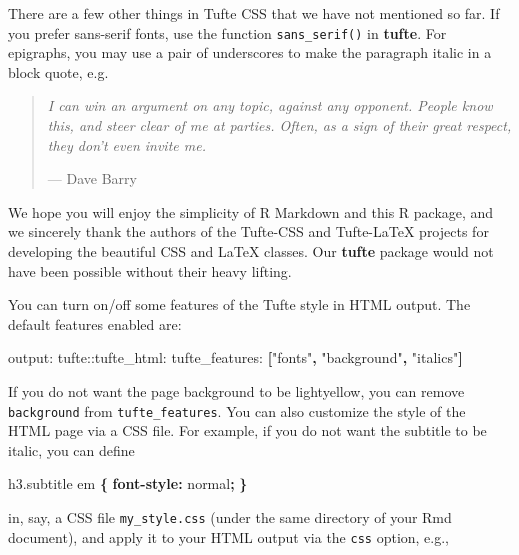 \documentclass[]{tufte-handout}
\newenvironment{Shaded}{}{}
\newcommand{\KeywordTok}[1]{\textcolor[rgb]{0.00,0.44,0.13}{\textbf{#1}}}
\newcommand{\DataTypeTok}[1]{\textcolor[rgb]{0.56,0.13,0.00}{#1}}
\newcommand{\FloatTok}[1]{\textcolor[rgb]{0.25,0.63,0.44}{#1}}
\newcommand{\StringTok}[1]{\textcolor[rgb]{0.25,0.44,0.63}{#1}}
\newcommand{\FunctionTok}[1]{\textcolor[rgb]{0.02,0.16,0.49}{#1}}
\newcommand{\AttributeTok}[1]{\textcolor[rgb]{0.49,0.56,0.16}{#1}}
\newcommand{\NormalTok}[1]{#1}
\begin{document}
There are a few other things in Tufte CSS that we have not mentioned so
far. If you prefer \textsf{sans-serif fonts}, use the function
\texttt{sans\_serif()} in \textbf{tufte}. For epigraphs, you may use a
pair of underscores to make the paragraph italic in a block quote, e.g.

\begin{quote}
\emph{I can win an argument on any topic, against any opponent. People
know this, and steer clear of me at parties. Often, as a sign of their
great respect, they don't even invite me.}

\hfill --- Dave Barry
\end{quote}

We hope you will enjoy the simplicity of R Markdown and this R package,
and we sincerely thank the authors of the Tufte-CSS and Tufte-LaTeX
projects for developing the beautiful CSS and LaTeX classes. Our
\textbf{tufte} package would not have been possible without their heavy
lifting.

You can turn on/off some features of the Tufte style in HTML output. The
default features enabled are:

\begin{Shaded}
\begin{Highlighting}[]
\FunctionTok{output:}
  \FunctionTok{tufte:}\AttributeTok{:tufte_html:}
    \FunctionTok{tufte_features:}\AttributeTok{ }\KeywordTok{[}\StringTok{"fonts"}\KeywordTok{,} \StringTok{"background"}\KeywordTok{,} \StringTok{"italics"}\KeywordTok{]}
\end{Highlighting}
\end{Shaded}

If you do not want the page background to be lightyellow, you can remove
\texttt{background} from \texttt{tufte\_features}. You can also
customize the style of the HTML page via a CSS file. For example, if you
do not want the subtitle to be italic, you can define

\begin{Shaded}
\begin{Highlighting}[]
\NormalTok{h3}\FloatTok{.subtitle}\NormalTok{ em }\KeywordTok{\{}
  \KeywordTok{font-style:} \DataTypeTok{normal}\KeywordTok{;}
\KeywordTok{\}}
\end{Highlighting}
\end{Shaded}

in, say, a CSS file \texttt{my\_style.css} (under the same directory of
your Rmd document), and apply it to your HTML output via the
\texttt{css} option, e.g.,
\end{document}
